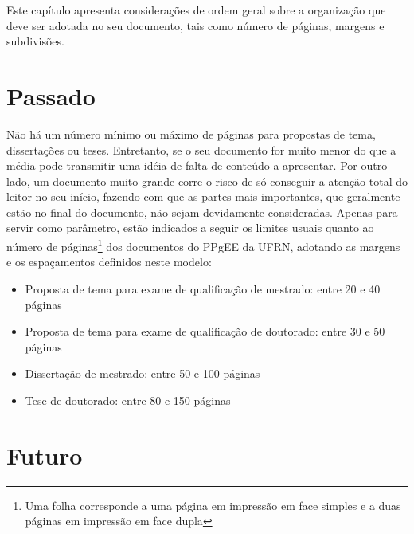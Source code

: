
\label{Cap:crono}

Este capítulo apresenta considerações de ordem geral sobre a
organização que deve ser adotada no seu documento, tais como número de
páginas, margens e subdivisões.

\section{Passado}
\label{Sec:crono}

Não há um número mínimo ou máximo de páginas para propostas de tema,
dissertações ou teses. Entretanto, se o seu documento for muito menor
do que a média pode transmitir uma idéia de falta de conteúdo a
apresentar. Por outro lado, um documento muito grande corre o risco de
só conseguir a atenção total do leitor no seu início, fazendo com que
as partes mais importantes, que geralmente estão no final do
documento, não sejam devidamente consideradas. Apenas para servir como
parâmetro, estão indicados a seguir os limites usuais quanto ao número
de páginas\footnote{Uma folha corresponde a uma página em impressão em
face simples e a duas páginas em impressão em face dupla} dos
documentos do PPgEE da UFRN, adotando as margens e os espaçamentos
definidos neste modelo:
\begin{itemize}
\item Proposta de tema para exame de qualificação de mestrado:
entre 20 e 40 páginas
\item Proposta de tema para exame de qualificação de doutorado:
entre 30 e 50 páginas
\item Dissertação de mestrado:
entre 50 e 100 páginas
\item Tese de doutorado:
entre 80 e 150 páginas
\end{itemize}

\section{Futuro}

